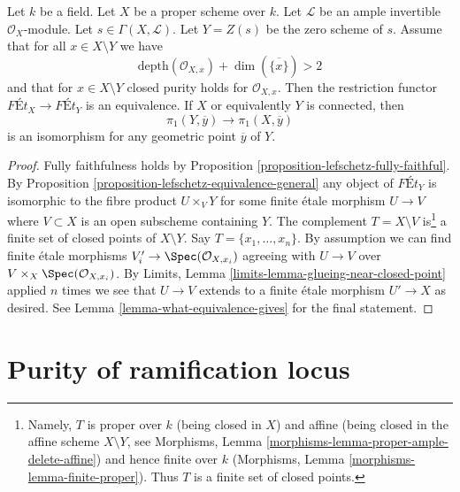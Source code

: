 \begin{proposition}
\label{proposition-lefschetz-equivalence}
Let $k$ be a field. Let $X$ be a proper scheme over $k$.
Let $\mathcal{L}$ be an ample invertible $\mathcal{O}_X$-module.
Let $s \in \Gamma(X, \mathcal{L})$. Let $Y = Z(s)$ be the
zero scheme of $s$.
Assume that for all $x \in X \setminus Y$ we have
$$
\text{depth}(\mathcal{O}_{X, x}) + \dim(\overline{\{x\}}) > 2
$$
and that for $x \in X \setminus Y$ closed purity holds for
$\mathcal{O}_{X, x}$. Then the restriction functor
$\textit{F\'Et}_X \to \textit{F\'Et}_Y$
is an equivalence. If $X$ or equivalently $Y$ is connected, then
$$
\pi_1(Y, \overline{y}) \to \pi_1(X, \overline{y})
$$
is an isomorphism for any geometric point $\overline{y}$ of $Y$.
\end{proposition}

\begin{proof}
Fully faithfulness holds by
Proposition \ref{proposition-lefschetz-fully-faithful}.
By Proposition \ref{proposition-lefschetz-equivalence-general}
any object of $\textit{F\'Et}_Y$
is isomorphic to the fibre product $U \times_V Y$ for some
finite \'etale morphism $U \to V$ where $V \subset X$
is an open subscheme containing $Y$.
The complement $T = X \setminus V$
is\footnote{Namely, $T$ is proper over $k$ (being closed in $X$)
and affine (being closed in the affine scheme $X \setminus Y$, see
Morphisms, Lemma \ref{morphisms-lemma-proper-ample-delete-affine})
and hence finite over $k$
(Morphisms, Lemma \ref{morphisms-lemma-finite-proper}).
Thus $T$ is a finite set of closed points.}
a finite set of closed points of $X \setminus Y$.
Say $T = \{x_1, \ldots, x_n\}$.
By assumption we can find finite \'etale morphisms
$V'_i \to \Spec(\mathcal{O}_{X, x_i})$ agreeing with
$U \to V$ over $V \times_X \Spec(\mathcal{O}_{X, x_i})$.
By Limits, Lemma \ref{limits-lemma-glueing-near-closed-point}
applied $n$ times we see that $U \to V$ extends to a finite \'etale
morphism $U' \to X$ as desired.
See Lemma \ref{lemma-what-equivalence-gives} for the final statement.
\end{proof}










\section{Purity of ramification locus}
\label{section-purity-ramification}

